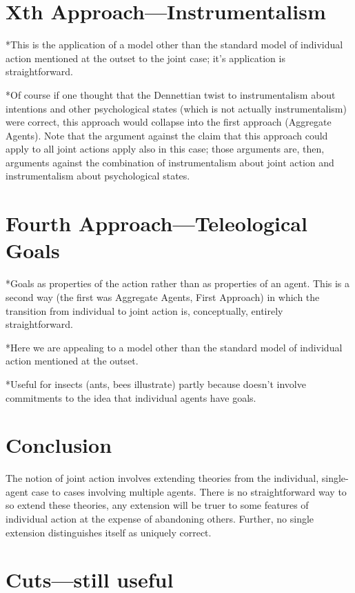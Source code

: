 \documentclass[12pt,a4paper]{extarticle}
\begin{document}
\section{Xth Approach---Instrumentalism}
*This is the application of a model other than the standard model of individual action mentioned at the outset to the joint case; it's application is straightforward.

*Of course if one thought that the Dennettian twist to instrumentalism about intentions and other psychological states (which is not actually instrumentalism) were correct, this approach would collapse into the first approach (Aggregate Agents).  Note that the argument against the claim that this approach could apply to all joint actions apply also in this case; those arguments are, then, arguments against the combination of instrumentalism about joint action and instrumentalism about psychological states.


\section{Fourth Approach---Teleological Goals}
*Goals as properties of the action rather than as properties of an agent.  This is a second way (the first was Aggregate Agents, First Approach) in which the transition from individual to joint action is, conceptually, entirely straightforward.

*Here we are appealing to a model other than the standard model of individual action mentioned at the outset.

*Useful for insects (ants, bees illustrate) partly because doesn't involve commitments to the idea that individual agents have goals.



\section{Conclusion}
The notion of joint action involves extending theories from the individual, single-agent case to cases involving multiple agents.  There is no straightforward way to so extend these theories, any extension will be truer to some features of individual action at the expense of abandoning others.  Further, no single extension distinguishes itself as uniquely correct.

 


\section{Cuts---still useful}
\end{document}
